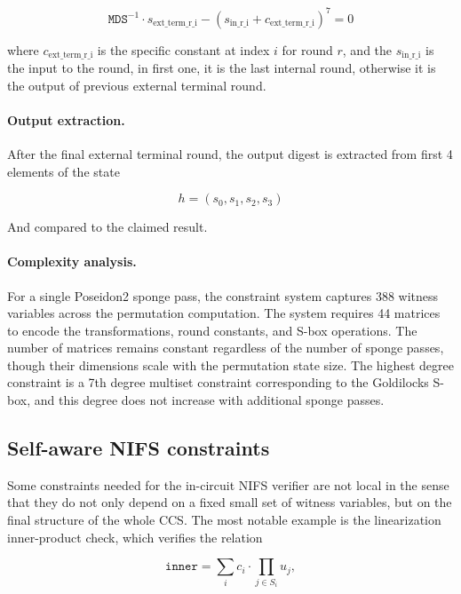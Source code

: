 \begin{equation}
	\texttt{MDS}^{-1} \cdot s_{\text{ext\_term\_r\_i}} - (s_{\text{in\_r\_i}} + c_{\text{ext\_term\_r\_i}})^7 = 0
\end{equation}


where $c_{\text{ext\_term\_r\_i}}$ is the specific constant at index $i$ for round
$r$, and the $s_{\text{in\_r\_i}}$ is the input to the round, in first one, it
is the last internal round, otherwise it is the output of previous external terminal round.

\paragraph{Output extraction.}

After the final external terminal round, the output digest is extracted
from first 4 elements of the state

\begin{equation}
	h = (s_0, s_1, s_2, s_3)
\end{equation}

And compared to the claimed result.

\paragraph{Complexity analysis.}

For a single Poseidon2 sponge pass, the constraint system captures 388 witness
variables across the permutation computation. The system requires 44
matrices to encode the transformations, round constants, and S-box
operations. The number of matrices remains constant regardless of
the number of sponge passes, though their dimensions scale with the permutation
state size. The highest degree constraint is a 7th degree multiset constraint
corresponding to the Goldilocks S-box, and this degree does not increase with
additional sponge passes.

\subsection{Self-aware NIFS constraints}

Some constraints needed for the in-circuit NIFS verifier are not local in the
sense that they do not only depend on a fixed small set of witness variables,
but on the final structure of the whole CCS. The most notable example is the
linearization inner-product check, which verifies the relation

\begin{equation}
	\texttt{inner} = \sum_i c_i \cdot \prod_{j \in S_i} u_j,
\end{equation}

